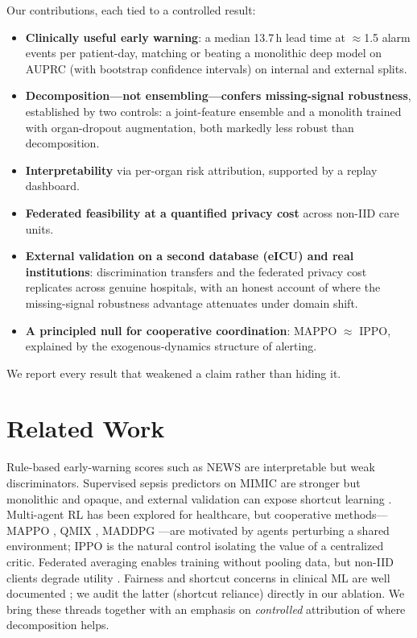 \documentclass[conference]{IEEEtran}
\begin{document}
Our contributions, each tied to a controlled result:
\begin{itemize}
  \item \textbf{Clinically useful early warning}: a median 13.7\,h lead time at
        $\approx$1.5 alarm events per patient-day, matching or beating a monolithic
        deep model on AUPRC (with bootstrap confidence intervals) on internal and
        external splits.
  \item \textbf{Decomposition---not ensembling---confers missing-signal robustness},
        established by two controls: a joint-feature ensemble and a monolith trained
        with organ-dropout augmentation, both markedly less robust than decomposition.
  \item \textbf{Interpretability} via per-organ risk attribution, supported by a
        replay dashboard.
  \item \textbf{Federated feasibility at a quantified privacy cost} across non-IID
        care units.
  \item \textbf{External validation on a second database (eICU) and real
        institutions}: discrimination transfers and the federated privacy cost
        replicates across genuine hospitals, with an honest account of where the
        missing-signal robustness advantage attenuates under domain shift.
  \item \textbf{A principled null for cooperative coordination}: MAPPO $\approx$ IPPO,
        explained by the exogenous-dynamics structure of alerting.
\end{itemize}
We report every result that weakened a claim rather than hiding it.

\section{Related Work}
Rule-based early-warning scores such as NEWS \cite{rcp2017news2} are interpretable
but weak discriminators. Supervised sepsis predictors on MIMIC
\cite{henry2015trewscore,johnson2023mimiciv} are stronger but monolithic and
opaque, and external validation can expose shortcut learning \cite{wong2021epic}.
Multi-agent RL has been explored for healthcare, but cooperative methods---MAPPO
\cite{yu2022mappo}, QMIX \cite{rashid2018qmix}, MADDPG \cite{lowe2017maddpg}---are
motivated by agents perturbing a shared environment; IPPO \cite{dewitt2020ippo} is
the natural control isolating the value of a centralized critic. Federated averaging
\cite{mcmahan2017fedavg} enables training without pooling data, but non-IID clients
degrade utility \cite{zhao2018noniid}. Fairness and shortcut concerns in clinical ML
are well documented \cite{obermeyer2019bias}; we audit the latter (shortcut
reliance) directly in our ablation. We bring these threads together with
an emphasis on \emph{controlled} attribution of where decomposition helps.
\end{document}
